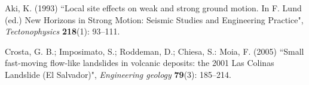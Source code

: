 \documentclass[11pt,twoside]{rmta2010eng}%
\begin{document}
\begin{thebibliography}{99}
Aki, K. (1993) 
``Local site effects on weak and strong ground motion. In F. Lund (ed.) New Horizons in Strong Motion: Seismic Studies and Engineering Practice", 
{\it Tectonophysics} {\bf 218}(1): 93--111.




Crosta, G. B.; Imposimato, S.; Roddeman, D.; Chiesa, S.: Moia, F. (2005)
``Small fast-moving flow-like landslides in volcanic deposits: the 2001 Las Colinas Landslide (El Salvador)", 
{\it Engineering geology} {\bf 79}(3): 185--214.





\end{thebibliography}
\end{document}
